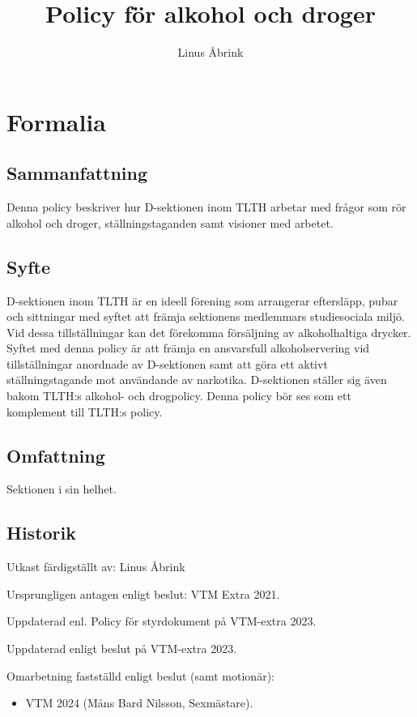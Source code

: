 \documentclass[]{dsekprotokoll}
\title{Policy för alkohol och droger}
\author{Linus Åbrink}
\begin{document}
\maketitle

\section{Formalia}

\subsection{Sammanfattning}
Denna policy beskriver hur D-sektionen inom TLTH arbetar med frågor som rör alkohol och droger, ställningstaganden samt visioner med arbetet.

\subsection{Syfte}
D-sektionen inom TLTH är en ideell förening som arrangerar eftersläpp, pubar och sittningar
med syftet att främja sektionens medlemmars studiesociala miljö. Vid dessa tillställningar kan
det förekomma försäljning av alkoholhaltiga drycker. Syftet med denna policy är att främja
en ansvarsfull alkoholservering vid tillställningar anordnade av D-sektionen samt att göra ett
aktivt ställningstagande mot användande av narkotika. D-sektionen ställer sig även bakom
TLTH:s alkohol- och drogpolicy. Denna policy bör ses som ett komplement till TLTH:s policy.

\subsection{Omfattning}
Sektionen i sin helhet.

\subsection{Historik}
Utkast färdigställt av: Linus Åbrink

Ursprungligen antagen enligt beslut: VTM Extra 2021.

Uppdaterad enl. Policy för styrdokument på VTM-extra 2023.

Uppdaterad enligt beslut på VTM-extra 2023.

Omarbetning fastställd enligt beslut (samt motionär):
\begin{itemize}
    \item VTM 2024 (Måns Bard Nilsson, Sexmästare).
\end{itemize}
\end{document}
